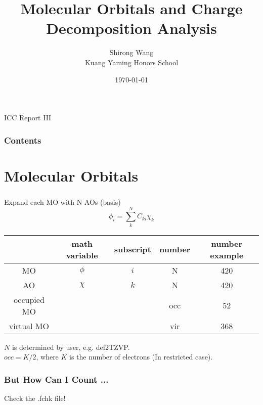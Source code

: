 \documentclass[10pt,aspectratio=43]{beamer}
\title{Molecular Orbitals and Charge Decomposition Analysis}	        %
\author[]{            %
    Shirong Wang\\[0.3cm]
    Kuang Yaming Honors School}
\date{\today}
\newcommand{\code}[1]{\colorbox{codegray}{{\Consolas#1}}}
\numberwithin{equation}{section}
\begin{document}
\begin{frame}
\hfill ICC Report III
\titlepage
\end{frame}

\begin{frame}
\frametitle{Contents}
\tableofcontents
\end{frame}

\section{Molecular Orbitals}
\begin{frame}
\frametitle{}
Expand each MO with N AOs (basis)
\begin{equation}\label{key}
\phi_i = \sum_k^N C_{ki}\chi_k
\end{equation}

\begin{tabbing}
	\centering
	\begin{tabular}{ccccc}
		\hline
		& math variable & subscript & number & number example\\ \hline
		MO & $ \phi $ & $ i $ & N & 420\\
		AO & $ \chi $ & $ k $ & N & 420\\
		occupied MO &   &   &   occ & 52\\
		virtual MO &   &     &  vir & 368\\
		\hline
	\end{tabular}
\end{tabbing}
$ N $ is determined by user, e.g. \code{def2TZVP}.\\
$ occ = K/2 $, where $ K $ is the number of electrons (In restricted case).\\

\end{frame}

\begin{frame}
\frametitle{But How Can I Count ...}
Check the \code{.fchk} file!
\makeset
\end{frame}
\end{document}
